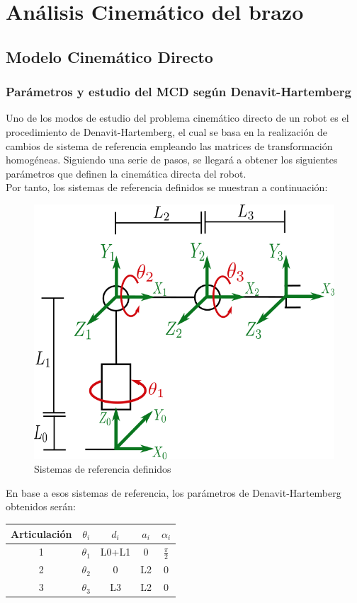 	\section{Análisis Cinemático del brazo}
	\subsection{Modelo Cinemático Directo}
	\subsubsection{Parámetros y estudio del MCD según Denavit-Hartemberg}
	Uno de los modos de estudio del problema cinemático directo de un robot es el procedimiento de Denavit-Hartemberg, el cual se basa en la realización de cambios de sistema de referencia empleando las matrices de transformación homogéneas. Siguiendo una serie de pasos, se llegará a obtener los siguientes parámetros que definen la cinemática directa del robot.\\
Por tanto, los sistemas de referencia definidos se muestran a continuación:
	\begin{figure}[h!]
		\centering
		\includegraphics[width=.5\textwidth]{ejes_DH}
		\caption{Sistemas de referencia definidos}
	\end{figure}

En base a esos sistemas de referencia, los parámetros de Denavit-Hartemberg obtenidos serán:
\begin{center}
	\begin{tabular}{|c||c|c|c|c|}
		\hline
		Articulación & $\theta_{i}$ & $d_{i}$ & $a_{i}$ & $\alpha_{i}$ \\
		\hline
		1 & $\theta_{1}$     				 &   L0+L1    &  			0 			 &  $\frac{\pi}{2}$  \\
		\hline
		2 & $\theta_{2}$ 				 &    0     &L2 & 0  \\
		\hline
		3 & $\theta_{3}$ &    L3    & 			 L2			 &  0\\
		\hline
	\end{tabular}
\end{center}

